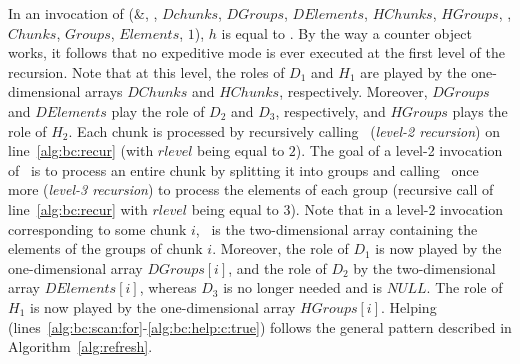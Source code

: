 % 
In an invocation of
\Traverse(\&\BufferCreation, \RawData, $\mathit{Dchunks}$, $\mathit{DGroups}$, $\mathit{DElements}$,
$\mathit{HChunks}$, $\mathit{HGroups}$, \False, $\mathit{Chunks}$, $\mathit{Groups}$, $\mathit{Elements}$, $1$),
$h$ is equal to \False. By the way a counter object works, it follows that 
no expeditive mode is ever executed at the first level of the recursion.
Note that at this level, the roles of $D_1$ and $H_1$ are played by the one-dimensional arrays
$DChunks$ and $HChunks$, respectively. Moreover, $DGroups$ and $DElements$ play the role of $D_2$ and $D_3$,
respectively, and $HGroups$ plays the role of $H_2$. Each chunk is processed by recursively calling
\Traverse\ ({\em level-2 recursion}) on line~\ref{alg:bc:recur} (with $\mathit{rlevel}$ being equal to $2$). 
The goal of a level-2 invocation of \Traverse\
is to process an entire chunk by splitting it into groups and calling
\Traverse\ once more ({\em level-3 recursion}) to process the elements of each group 
(recursive call of line~\ref{alg:bc:recur} with $\mathit{rlevel}$ being equal to $3$). 
Note that in a level-2 invocation corresponding to some chunk $i$, 
\RawData\ is the two-dimensional array containing the elements of the groups of chunk $i$.
Moreover, the role of $D_1$ is now played by the one-dimensional array $DGroups[i]$, 
and the role of $D_2$ by the two-dimensional array $DElements[i]$,
whereas $D_3$ is no longer needed and is $\mathit{NULL}$.
The role of $H_1$ is now played by the one-dimensional array $HGroups[i]$. 
Helping (lines~\ref{alg:bc:scan:for}-\ref{alg:bc:help:c:true}) follows the general pattern
described in Algorithm~\ref{alg:refresh}. 



